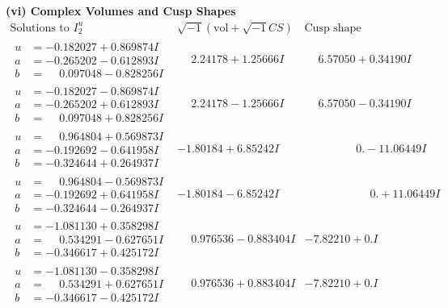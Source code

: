 \documentclass[1p]{elsarticle_modified}
\theoremstyle{definition}
\newcommand{\I}{\sqrt{-1}}
\begin{document}
\newpage\flushleft \textbf{(vi) Complex Volumes and Cusp Shapes}
$$\begin{array}{c|c|c}  
\text{Solutions to }I^u_{2}& \I (\text{vol} + \sqrt{-1}CS) & \text{Cusp shape}\\
 \hline 
\begin{aligned}
u &= -0.182027 + 0.869874 I \\
a &= -0.265202 - 0.612893 I \\
b &= \phantom{-}0.097048 - 0.828256 I\end{aligned}
 & \phantom{-}2.24178 + 1.25666 I & \phantom{-}6.57050 + 0.34190 I \\ \hline\begin{aligned}
u &= -0.182027 - 0.869874 I \\
a &= -0.265202 + 0.612893 I \\
b &= \phantom{-}0.097048 + 0.828256 I\end{aligned}
 & \phantom{-}2.24178 - 1.25666 I & \phantom{-}6.57050 - 0.34190 I \\ \hline\begin{aligned}
u &= \phantom{-}0.964804 + 0.569873 I \\
a &= -0.192692 - 0.641958 I \\
b &= -0.324644 + 0.264937 I\end{aligned}
 & -1.80184 + 6.85242 I & \phantom{-0.000000 } 0. - 11.06449 I \\ \hline\begin{aligned}
u &= \phantom{-}0.964804 - 0.569873 I \\
a &= -0.192692 + 0.641958 I \\
b &= -0.324644 - 0.264937 I\end{aligned}
 & -1.80184 - 6.85242 I & \phantom{-0.000000 -}0. + 11.06449 I \\ \hline\begin{aligned}
u &= -1.081130 + 0.358298 I \\
a &= \phantom{-}0.534291 - 0.627651 I \\
b &= -0.346617 + 0.425172 I\end{aligned}
 & \phantom{-}0.976536 - 0.883404 I & -7.82210 + 0. I\phantom{ +0.000000I} \\ \hline\begin{aligned}
u &= -1.081130 - 0.358298 I \\
a &= \phantom{-}0.534291 + 0.627651 I \\
b &= -0.346617 - 0.425172 I\end{aligned}
 & \phantom{-}0.976536 + 0.883404 I & -7.82210 + 0. I\phantom{ +0.000000I} \\ \hline\begin{aligned}

\end{aligned}
\end{array}$$
\end{document}
